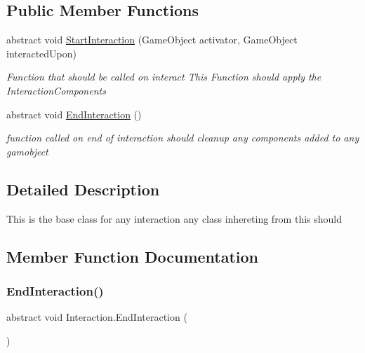 \subsection*{Public Member Functions}
\begin{DoxyCompactItemize}
\item 
abstract void \mbox{\hyperlink{class_interaction_afa5031e1db8f7c23cf26c896937e69f9}{Start\+Interaction}} (Game\+Object activator, Game\+Object interacted\+Upon)
\begin{DoxyCompactList}\small\item\em Function that should be called on interact This Function should apply the Interaction\+Components \end{DoxyCompactList}\item 
abstract void \mbox{\hyperlink{class_interaction_a13c7d99dbecf8e0d61973fd23de6400c}{End\+Interaction}} ()
\begin{DoxyCompactList}\small\item\em function called on end of interaction should cleanup any components added to any gamobject \end{DoxyCompactList}\end{DoxyCompactItemize}


\subsection{Detailed Description}
This is the base class for any interaction any class inhereting from this should 



\subsection{Member Function Documentation}
\mbox{\label{class_interaction_a13c7d99dbecf8e0d61973fd23de6400c}} 
\subsubsection{\texorpdfstring{End\+Interaction()}{EndInteraction()}}
{\footnotesize\ttfamily abstract void Interaction.\+End\+Interaction (\begin{DoxyParamCaption}{ }\end{DoxyParamCaption})\hspace{0.3cm}{\ttfamily [pure virtual]}}



